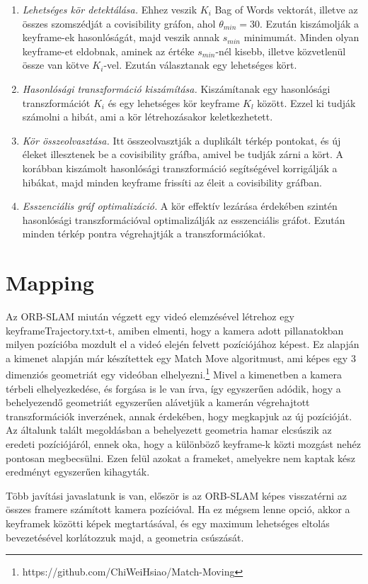 \begin{enumerate}
	\item \textit{Lehetséges kör detektálása.} Ehhez veszik $K_i$ Bag of Words vektorát, illetve az összes szomszédját a covisibility gráfon, ahol $\theta_{min} = 30$. Ezután kiszámolják a keyframe-ek hasonlóságát, majd veszik annak $s_{min}$ minimumát. Minden olyan keyframe-et eldobnak, aminek az értéke $s_{min}$-nél kisebb, illetve közvetlenül össze van kötve $K_i$-vel. Ezután választanak egy lehetséges kört.
	\item \textit{Hasonlósági transzformáció kiszámítása.} Kiszámítanak egy hasonlósági transzformációt $K_i$ és egy lehetséges kör keyframe $K_l$ között. Ezzel ki tudják számolni a hibát, ami a kör létrehozásakor keletkezhetett.
	\item \textit{Kör összeolvasztása.} Itt összeolvasztják a duplikált térkép pontokat, és új éleket illesztenek be a covisibility gráfba, amivel be tudják zárni a kört. A korábban kiszámolt hasonlósági transzformáció segítségével korrigálják a hibákat, majd minden keyframe frissíti az éleit a covisibility gráfban.
	\item \textit{Esszenciális gráf optimalizáció.} A kör effektív lezárása érdekében szintén hasonlósági transzformációval optimalizálják az esszenciális gráfot. Ezután minden térkép pontra végrehajtják a transzformációkat.
\end{enumerate}

\section{Mapping}

Az ORB-SLAM miután végzett egy videó elemzésével létrehoz egy keyframeTrajectory.txt-t, amiben elmenti, hogy a kamera adott pillanatokban milyen pozícióba mozdult el a videó elején felvett pozíciójához képest.
Ez alapján a kimenet alapján már készítettek egy Match Move algoritmust, ami képes egy 3 dimenziós geometriát egy videóban elhelyezni.\footnote{https://github.com/ChiWeiHsiao/Match-Moving}
Mivel a kimenetben a kamera térbeli elhelyezkedése, és forgása is le van írva, így egyszerűen adódik, hogy a behelyezendő geometriát egyszerűen alávetjük a kamerán végrehajtott transzformációk inverzének, annak érdekében, hogy megkapjuk az új pozícióját.
Az általunk talált megoldásban a behelyezett geometria hamar elcsúszik az eredeti pozíciójáról, ennek oka, hogy a különböző keyframe-k közti mozgást nehéz pontosan megbecsülni.
Ezen felül azokat a frameket, amelyekre nem kaptak kész eredményt egyszerűen kihagyták.

Több javítási javaslatunk is van, először is az ORB-SLAM képes visszatérni az összes framere számított kamera pozícióval.
Ha ez mégsem lenne opció, akkor a keyframek közötti képek megtartásával, és egy maximum lehetséges eltolás bevezetésével korlátozzuk majd, a geometria csúszását.